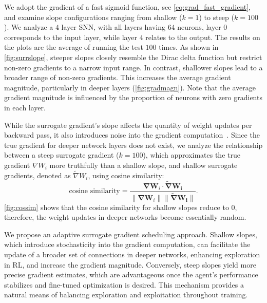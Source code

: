We adopt the gradient of a fast sigmoid function, see \autoref{eq:grad_fast_gradient}, and examine slope configurations ranging from shallow ($k = 1$) to steep ($k = 100$). We analyze a $4$ layer SNN, with all layers having $64$ neurons, layer $0$ corresponds to the input layer, while layer $4$ relates to the output. The results on the plots are the average of running the test $100$ times. As shown in \autoref{fig:surrslope}, steeper slopes closely resemble the Dirac delta function but restrict non-zero gradients to a narrow input range. In contrast, shallower slopes lead to a broader range of non-zero gradients. This increases the average gradient magnitude, particularly in deeper layers (\autoref{fig:gradmagn}). Note that the average gradient magnitude is influenced by the proportion of neurons with zero gradients in each layer. 

While the surrogate gradient's slope affects the quantity of weight updates per backward pass, it also introduces noise into the gradient computation~\cite{GygaxElucidating}. Since the true gradient for deeper network layers does not exist, we analyze the relationship between a steep surrogate gradient ($k=100$), which approximates the true gradient $\nabla W_i$ more truthfully than a shallow slope, and shallow surrogate gradients, denoted as $\tilde{\nabla}W_i$, using cosine similarity:
\begin{equation}
\text{cosine similarity} = \frac{\mathbf{\nabla W}_i \cdot \mathbf{\tilde{\nabla}W_i}}{\|\mathbf{\nabla W}_i\| \|\mathbf{\tilde{\nabla}W_i}\|}.
\end{equation}
\autoref{fig:cossim} shows that the cosine similarity for shallow slopes reduce to $0$, therefore, the weight updates in deeper networks become essentially random.

We propose an adaptive surrogate gradient scheduling approach. Shallow slopes, which introduce stochasticity into the gradient computation, can facilitate the update of a broader set of connections in deeper networks, enhancing exploration in RL, and increase the gradient magnitude. Conversely, steep slopes yield more precise gradient estimates, which are advantageous once the agent’s performance stabilizes and fine-tuned optimization is desired. This mechanism provides a natural means of balancing exploration and exploitation throughout training.

